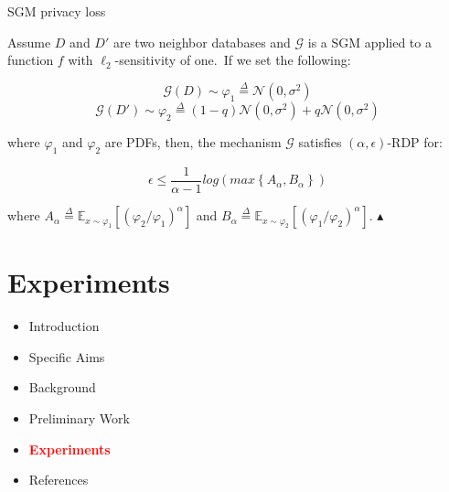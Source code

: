 \documentclass{beamer}
\begin{document}
\begin{frame}{SGM privacy loss}

\begin{theorem}

Assume $D$ and $D'$ are two neighbor databases and $\mathcal{G}$ is a SGM applied to a function $f$ with $\ell_{2}$-sensitivity of one.~If we set the following:

$$\mathcal{G}(D) \sim \varphi_{1} \overset{\Delta}{=} \mathcal{N}(0,\sigma^2)$$
$$\mathcal{G}(D') \sim \varphi_{2} \overset{\Delta}{=} (1-q)\mathcal{N}(0,\sigma^2) + q \mathcal{N}(0,\sigma^2)$$


where $\varphi_{1}$ and $\varphi_{2}$ are PDFs, then, the mechanism $\mathcal{G}$ satisfies $(\alpha,\epsilon)$-RDP for:

$$\epsilon \leq \frac{1}{\alpha - 1} log(max\left \{ A_\alpha,B_\alpha \right \})$$

where $ A_{\alpha} \overset{\Delta}{=} \mathbb{E}_{x \sim \varphi_{1}}\left [ \left ( \varphi_{2} / \varphi_{1} \right )^\alpha \right ]$ and $ B_{\alpha} \overset{\Delta}{=} \mathbb{E}_{x \sim \varphi_{2}}\left [ \left ( \varphi_{1} / \varphi_{2} \right )^\alpha \right ]$. $\blacktriangle$

\end{theorem}
    
\end{frame}



\section{Experiments}

\begin{frame}[noframenumbering]{}

\begin{itemize}
  \item Introduction
  \item Specific Aims
  \item Background
  \item Preliminary Work
  \item \textcolor{red}{\textbf{Experiments}}
  \item References
  
\end{itemize}

\end{frame}
\end{document}
